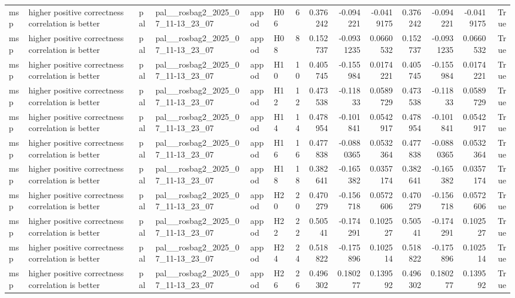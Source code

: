 \begin{longtable}{llllllrrrrrrrr}
msp & higher positive correctness correlation is better & pal & pal\_\_rosbag2\_2025\_07\_11-13\_23\_07 & appod & H06 & 6 & 0.376242 & -0.094221 & -0.0419175 & 0.376242 & -0.094221 & -0.0419175 & True \\
msp & higher positive correctness correlation is better & pal & pal\_\_rosbag2\_2025\_07\_11-13\_23\_07 & appod & H08 & 8 & 0.152737 & -0.0931235 & 0.0660532 & 0.152737 & -0.0931235 & 0.0660532 & True \\
msp & higher positive correctness correlation is better & pal & pal\_\_rosbag2\_2025\_07\_11-13\_23\_07 & appod & H10 & 10 & 0.405745 & -0.155984 & 0.0174221 & 0.405745 & -0.155984 & 0.0174221 & True \\
msp & higher positive correctness correlation is better & pal & pal\_\_rosbag2\_2025\_07\_11-13\_23\_07 & appod & H12 & 12 & 0.473538 & -0.11833 & 0.0589729 & 0.473538 & -0.11833 & 0.0589729 & True \\
msp & higher positive correctness correlation is better & pal & pal\_\_rosbag2\_2025\_07\_11-13\_23\_07 & appod & H14 & 14 & 0.478954 & -0.101841 & 0.0542917 & 0.478954 & -0.101841 & 0.0542917 & True \\
msp & higher positive correctness correlation is better & pal & pal\_\_rosbag2\_2025\_07\_11-13\_23\_07 & appod & H16 & 16 & 0.477838 & -0.0880365 & 0.0532364 & 0.477838 & -0.0880365 & 0.0532364 & True \\
msp & higher positive correctness correlation is better & pal & pal\_\_rosbag2\_2025\_07\_11-13\_23\_07 & appod & H18 & 18 & 0.382641 & -0.165382 & 0.0357174 & 0.382641 & -0.165382 & 0.0357174 & True \\
msp & higher positive correctness correlation is better & pal & pal\_\_rosbag2\_2025\_07\_11-13\_23\_07 & appod & H20 & 20 & 0.470279 & -0.156718 & 0.0572606 & 0.470279 & -0.156718 & 0.0572606 & True \\
msp & higher positive correctness correlation is better & pal & pal\_\_rosbag2\_2025\_07\_11-13\_23\_07 & appod & H22 & 22 & 0.50541 & -0.174291 & 0.102527 & 0.50541 & -0.174291 & 0.102527 & True \\
msp & higher positive correctness correlation is better & pal & pal\_\_rosbag2\_2025\_07\_11-13\_23\_07 & appod & H24 & 24 & 0.518822 & -0.175896 & 0.102514 & 0.518822 & -0.175896 & 0.102514 & True \\
msp & higher positive correctness correlation is better & pal & pal\_\_rosbag2\_2025\_07\_11-13\_23\_07 & appod & H26 & 26 & 0.496302 & 0.180277 & 0.139592 & 0.496302 & 0.180277 & 0.139592 & True \\

\end{longtable}
